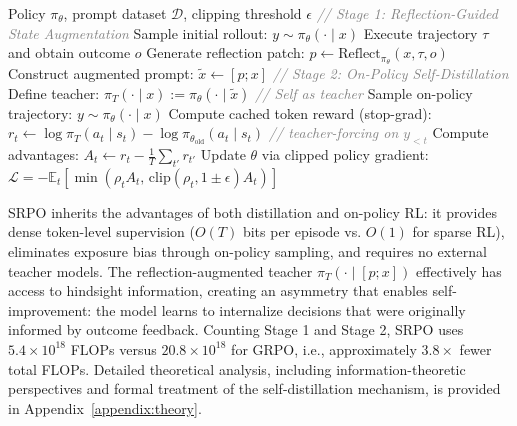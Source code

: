 \documentclass{article}
\newcommand{\method}{SRPO}
\theoremstyle{plain}
\theoremstyle{definition}
\theoremstyle{remark}
\begin{document}
\begin{algorithm}
\caption{\method{}: Self-Reflective Policy Optimization}
\label{alg:reppo}
\begin{algorithmic}[1]
\REQUIRE Policy $\pi_\theta$, prompt dataset $\mathcal{D}$, clipping threshold $\epsilon$
    \STATE \textcolor{gray}{\textit{// Stage 1: Reflection-Guided State Augmentation}}
    \STATE Sample initial rollout: $y \sim \pi_\theta(\cdot\mid x)$
    \STATE Execute trajectory $\tau$ and obtain outcome $o$
    \STATE Generate reflection patch: $p \leftarrow \mathrm{Reflect}_{\pi_\theta}(x, \tau, o)$
    \STATE Construct augmented prompt: $\tilde{x} \leftarrow [p; x]$
    \STATE \textcolor{gray}{\textit{// Stage 2: On-Policy Self-Distillation}}
    \STATE Define teacher: $\pi_T(\cdot\mid x) := \pi_\theta(\cdot\mid \tilde{x})$ \hfill \textcolor{gray}{\textit{// Self as teacher}}
    \STATE Sample on-policy trajectory: $y \sim \pi_\theta(\cdot\mid x)$
      \STATE Compute cached token reward (stop-grad): $r_t \leftarrow \log\pi_T(a_t\mid s_t) - \log\pi_{\theta_{\mathrm{old}}}(a_t\mid s_t)$ \hfill \textcolor{gray}{\textit{// teacher-forcing on $y_{<t}$}}
    \ENDFOR
    \STATE Compute advantages: $A_t \leftarrow r_t - \frac{1}{T}\sum_{t'} r_{t'}$
    \STATE Update $\theta$ via clipped policy gradient: 
    \STATE \hspace{1em} $\mathcal{L} = -\mathbb{E}_t\left[\min\left(\rho_t A_t,\, \mathrm{clip}(\rho_t, 1\pm\epsilon) A_t\right)\right]$
  \ENDFOR
\ENDFOR
\end{algorithmic}
\end{algorithm}

SRPO inherits the advantages of both distillation and on-policy RL: it provides dense token-level supervision ($O(T)$ bits per episode vs. $O(1)$ for sparse RL), eliminates exposure bias through on-policy sampling, and requires no external teacher models.
The reflection-augmented teacher $\pi_T(\cdot\mid[p;x])$ effectively has access to hindsight information, creating an asymmetry that enables self-improvement: the model learns to internalize decisions that were originally informed by outcome feedback.
Counting Stage 1 and Stage 2, SRPO uses $5.4 \times 10^{18}$ FLOPs versus $20.8 \times 10^{18}$ for GRPO, i.e., approximately $3.8\times$ fewer total FLOPs.
Detailed theoretical analysis, including information-theoretic perspectives and formal treatment of the self-distillation mechanism, is provided in Appendix~\ref{appendix:theory}.
\end{document}
